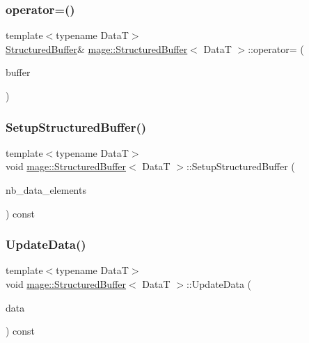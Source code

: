\subsubsection{\texorpdfstring{operator=()}{operator=()}\hspace{0.1cm}{\footnotesize\ttfamily [2/2]}}
{\footnotesize\ttfamily template$<$typename DataT$>$ \\
\hyperlink{structmage_1_1_structured_buffer}{Structured\+Buffer}\& \hyperlink{structmage_1_1_structured_buffer}{mage\+::\+Structured\+Buffer}$<$ DataT $>$\+::operator= (\begin{DoxyParamCaption}\item[{\hyperlink{structmage_1_1_structured_buffer}{Structured\+Buffer}$<$ DataT $>$ \&\&}]{buffer }\end{DoxyParamCaption})\hspace{0.3cm}{\ttfamily [delete]}}

\hypertarget{structmage_1_1_structured_buffer_a569008d501e11d208288022372df2f48}{}\label{structmage_1_1_structured_buffer_a569008d501e11d208288022372df2f48} 
\subsubsection{\texorpdfstring{Setup\+Structured\+Buffer()}{SetupStructuredBuffer()}}
{\footnotesize\ttfamily template$<$typename DataT$>$ \\
void \hyperlink{structmage_1_1_structured_buffer}{mage\+::\+Structured\+Buffer}$<$ DataT $>$\+::Setup\+Structured\+Buffer (\begin{DoxyParamCaption}\item[{size\+\_\+t}]{nb\+\_\+data\+\_\+elements }\end{DoxyParamCaption}) const\hspace{0.3cm}{\ttfamily [private]}}

\hypertarget{structmage_1_1_structured_buffer_aac2597ea7ee586207bf4918c3b4f9798}{}\label{structmage_1_1_structured_buffer_aac2597ea7ee586207bf4918c3b4f9798} 
\subsubsection{\texorpdfstring{Update\+Data()}{UpdateData()}}
{\footnotesize\ttfamily template$<$typename DataT$>$ \\
void \hyperlink{structmage_1_1_structured_buffer}{mage\+::\+Structured\+Buffer}$<$ DataT $>$\+::Update\+Data (\begin{DoxyParamCaption}\item[{const vector$<$ DataT $>$ \&}]{data }\end{DoxyParamCaption}) const}



